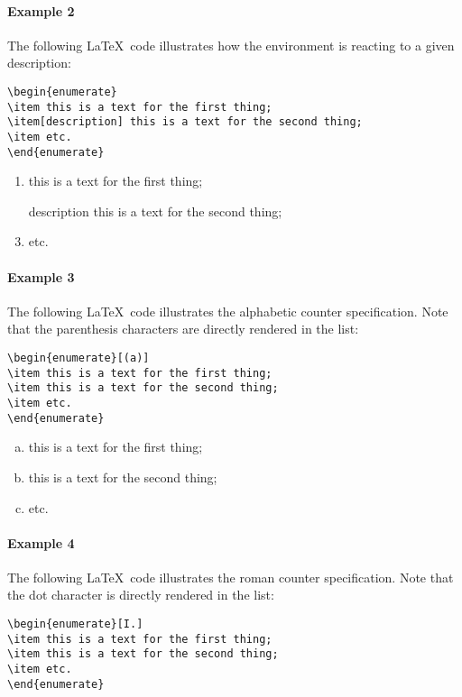 \documentclass[book,taskpackage,specpackage,codepackage]{upmethodology-document}
\begin{document}
\paragraph{Example 2} The following \LaTeX~code illustrates how the environment is reacting to a given description:
\begin{verbatim}
\begin{enumerate}
\item this is a text for the first thing;
\item[description] this is a text for the second thing;
\item etc.
\end{enumerate}
\end{verbatim}

\begin{enumerate}
\item this is a text for the first thing;
\item[description] this is a text for the second thing;
\item etc.
\end{enumerate}

\paragraph{Example 3} The following \LaTeX~code illustrates the alphabetic counter specification. Note that the parenthesis characters are directly rendered in the list:
\begin{verbatim}
\begin{enumerate}[(a)]
\item this is a text for the first thing;
\item this is a text for the second thing;
\item etc.
\end{enumerate}
\end{verbatim}

\begin{enumerate}[(a)]
\item this is a text for the first thing;
\item this is a text for the second thing;
\item etc.
\end{enumerate}

\paragraph{Example 4} The following \LaTeX~code illustrates the roman counter specification. Note that the dot character is directly rendered in the list:
\begin{verbatim}
\begin{enumerate}[I.]
\item this is a text for the first thing;
\item this is a text for the second thing;
\item etc.
\end{enumerate}
\end{verbatim}
\end{document}
